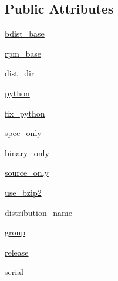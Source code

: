 \subsection*{Public Attributes}
\begin{DoxyCompactItemize}
\item 
\hyperlink{classsetuptools_1_1__distutils_1_1command_1_1bdist__rpm_1_1bdist__rpm_a5804bcc39b8cf8fd8346e745f41fcc29}{bdist\+\_\+base}
\item 
\hyperlink{classsetuptools_1_1__distutils_1_1command_1_1bdist__rpm_1_1bdist__rpm_ad8c623869ecd3f5be59f90b6d1598e45}{rpm\+\_\+base}
\item 
\hyperlink{classsetuptools_1_1__distutils_1_1command_1_1bdist__rpm_1_1bdist__rpm_abc5548e9afed24782483d0758190e1b5}{dist\+\_\+dir}
\item 
\hyperlink{classsetuptools_1_1__distutils_1_1command_1_1bdist__rpm_1_1bdist__rpm_ae1bbec32830bdc850765c8a6d43ceb0b}{python}
\item 
\hyperlink{classsetuptools_1_1__distutils_1_1command_1_1bdist__rpm_1_1bdist__rpm_ab880540463d6d23df0e067ae062830a1}{fix\+\_\+python}
\item 
\hyperlink{classsetuptools_1_1__distutils_1_1command_1_1bdist__rpm_1_1bdist__rpm_a39896cf46afafc5609644c7e6e80927c}{spec\+\_\+only}
\item 
\hyperlink{classsetuptools_1_1__distutils_1_1command_1_1bdist__rpm_1_1bdist__rpm_aba5b2ec446291b3f0f2fc4a9286df033}{binary\+\_\+only}
\item 
\hyperlink{classsetuptools_1_1__distutils_1_1command_1_1bdist__rpm_1_1bdist__rpm_adf02098ca1a904f78f03ad1a4abb4c2b}{source\+\_\+only}
\item 
\hyperlink{classsetuptools_1_1__distutils_1_1command_1_1bdist__rpm_1_1bdist__rpm_abac81db438efe9a1a4404b5ce227e57a}{use\+\_\+bzip2}
\item 
\hyperlink{classsetuptools_1_1__distutils_1_1command_1_1bdist__rpm_1_1bdist__rpm_ab2c9afc79856d17637ab551434b6a532}{distribution\+\_\+name}
\item 
\hyperlink{classsetuptools_1_1__distutils_1_1command_1_1bdist__rpm_1_1bdist__rpm_a53a3d8b6a042f026c47b295cc90f3c01}{group}
\item 
\hyperlink{classsetuptools_1_1__distutils_1_1command_1_1bdist__rpm_1_1bdist__rpm_aa4fdc0822f4b0302ba4eb022b6576b9a}{release}
\item 
\hyperlink{classsetuptools_1_1__distutils_1_1command_1_1bdist__rpm_1_1bdist__rpm_ab543a6f87ce2f261cb8022553a9d5250}{serial}
\item 

\end{DoxyCompactItemize}

